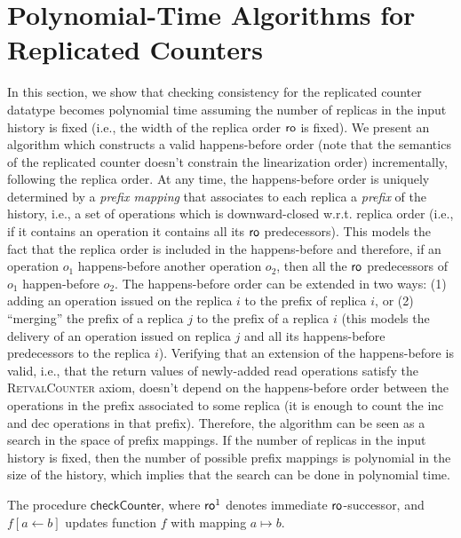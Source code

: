\section{Polynomial-Time Algorithms for Replicated Counters}
\label{sec:counter}

In this section, we show that checking consistency for the replicated counter datatype becomes polynomial time assuming the number of replicas in the input history is fixed (i.e., the width of the replica order $\mathsf{ro}$ is fixed). We present an algorithm which constructs a valid happens-before order (note that the semantics of the replicated counter doesn't constrain the linearization order) incrementally, following the replica order. At any time, the happens-before order is uniquely determined by a \emph{prefix mapping} that associates to each replica a \emph{prefix} of the history, i.e., a set of operations which is downward-closed w.r.t. replica order (i.e., if it contains an operation it contains all its $\mathsf{ro}$ predecessors). This models the fact that the replica order is included in the happens-before and therefore, if an operation $o_1$ happens-before another operation $o_2$, then all the $\mathsf{ro}$ predecessors of $o_1$ happen-before $o_2$. The happens-before order can be extended in two ways: (1) adding an operation issued on the replica $i$ to the prefix of replica $i$, or (2) ``merging'' the prefix of a replica $j$ to the prefix of a replica $i$ (this models the delivery of an operation issued on replica $j$ and all its happens-before predecessors to the replica $i$). Verifying that an extension of the happens-before is valid, i.e., that the return values of newly-added {\sf read} operations satisfy the \textsc{RetvalCounter} axiom, doesn't depend on the happens-before order between the operations in the prefix associated to some replica (it is enough to count the {\sf inc} and {\sf dec} operations in that prefix). Therefore, the algorithm can be seen as a search in the space of prefix mappings. If the number of replicas in the input history is fixed, then the number of possible prefix mappings is polynomial in the size of the history, which implies that the search can be done in polynomial time.

\begin{algorithm}[t]
  {\footnotesize}
  \caption{The procedure $\mathsf{checkCounter}$, where $\mathsf{ro}^1$ denotes immediate $\mathsf{ro}$-successor, and $f[a\leftarrow b]$ updates function $f$ with mapping $a \mapsto b$.}
  \label{countercrdtalgo:main}
\end{algorithm}


